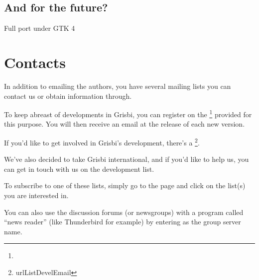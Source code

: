 \subsection{And for the future?}

Full port under \gls{GTK} 4

\section{Contacts\label{introduction-contacts}}

In addition to emailing the authors, you have several mailing lists you can contact us or obtain information through.

To keep abreast of developments in Grisbi, you can register on the \footnote{\urlListInfoEmail{}} provided for this purpose.  You will then receive an email at the release of each new version.

If you'd like to get involved in Grisbi's development, there's a \footnote{urlListDevelEmail{}}.


We've also decided to take Grisbi international, and if you'd like to help us, you can get in touch with us on the development list.



To subscribe to one of these lists, simply go to the \urlListDiffGrisbi{} page and click on the list(s) you are interested in.

You can also use the discussion forums (or newsgroups) with a program called ``news reader'' (like Thunderbird for example) by entering  as the group server name.

